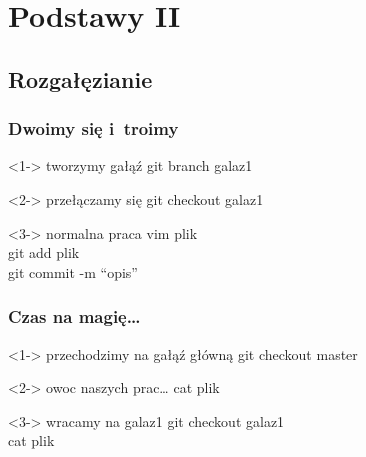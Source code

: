 \documentclass[10pt]{beamer}
\begin{document}
\section{Podstawy II}
\subsection{Rozgałęzianie}
\begin{frame}
	\frametitle{Dwoimy się i~troimy}	
	\begin{block}<1->
	{tworzymy gałąź}
	git branch galaz1
	\end{block}
	\begin{block}<2->
	{przełączamy się}
	git checkout galaz1
	\end{block}
	\begin{block}<3->
	{normalna praca}
	vim plik\\
	git add plik\\
	git commit -m ``opis''
	\end{block}
\end{frame}
\begin{frame}
	\frametitle{Czas na magię\ldots}
	\begin{block}<1->
	{przechodzimy na gałąź główną}
	git checkout master
	\end{block}
	\begin{block}<2->
	{owoc naszych prac\ldots}
	cat plik
	\end{block}
	\begin{block}<3->
	{wracamy na galaz1}
	git checkout galaz1\\
	cat plik
	\end{block}
\end{frame}
\end{document}

